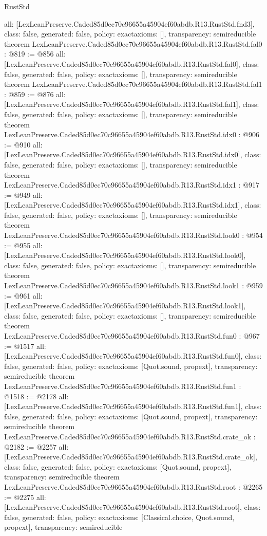 \begin{lexlean}{RustStd}
\begin{coremodule}
{  all: [LexLeanPreserve.Caded85d0ec70c96655a45904ef60abdb.R13.RustStd.fnd3],
  class: false,
  generated: false,
  policy: exact{axioms: []},
  transparency: semireducible
}
theorem LexLeanPreserve.Caded85d0ec70c96655a45904ef60abdb.R13.RustStd.fal0 : @819 := @856 {
  all: [LexLeanPreserve.Caded85d0ec70c96655a45904ef60abdb.R13.RustStd.fal0],
  class: false,
  generated: false,
  policy: exact{axioms: []},
  transparency: semireducible
}
theorem LexLeanPreserve.Caded85d0ec70c96655a45904ef60abdb.R13.RustStd.fal1 : @859 := @876 {
  all: [LexLeanPreserve.Caded85d0ec70c96655a45904ef60abdb.R13.RustStd.fal1],
  class: false,
  generated: false,
  policy: exact{axioms: []},
  transparency: semireducible
}
theorem LexLeanPreserve.Caded85d0ec70c96655a45904ef60abdb.R13.RustStd.idx0 : @906 := @910 {
  all: [LexLeanPreserve.Caded85d0ec70c96655a45904ef60abdb.R13.RustStd.idx0],
  class: false,
  generated: false,
  policy: exact{axioms: []},
  transparency: semireducible
}
theorem LexLeanPreserve.Caded85d0ec70c96655a45904ef60abdb.R13.RustStd.idx1 : @917 := @949 {
  all: [LexLeanPreserve.Caded85d0ec70c96655a45904ef60abdb.R13.RustStd.idx1],
  class: false,
  generated: false,
  policy: exact{axioms: []},
  transparency: semireducible
}
theorem LexLeanPreserve.Caded85d0ec70c96655a45904ef60abdb.R13.RustStd.look0 : @954 := @955 {
  all: [LexLeanPreserve.Caded85d0ec70c96655a45904ef60abdb.R13.RustStd.look0],
  class: false,
  generated: false,
  policy: exact{axioms: []},
  transparency: semireducible
}
theorem LexLeanPreserve.Caded85d0ec70c96655a45904ef60abdb.R13.RustStd.look1 : @959 := @961 {
  all: [LexLeanPreserve.Caded85d0ec70c96655a45904ef60abdb.R13.RustStd.look1],
  class: false,
  generated: false,
  policy: exact{axioms: []},
  transparency: semireducible
}
theorem LexLeanPreserve.Caded85d0ec70c96655a45904ef60abdb.R13.RustStd.fun0 : @967 := @1517 {
  all: [LexLeanPreserve.Caded85d0ec70c96655a45904ef60abdb.R13.RustStd.fun0],
  class: false,
  generated: false,
  policy: exact{axioms: [Quot.sound, propext]},
  transparency: semireducible
}
theorem LexLeanPreserve.Caded85d0ec70c96655a45904ef60abdb.R13.RustStd.fun1 : @1518 := @2178 {
  all: [LexLeanPreserve.Caded85d0ec70c96655a45904ef60abdb.R13.RustStd.fun1],
  class: false,
  generated: false,
  policy: exact{axioms: [Quot.sound, propext]},
  transparency: semireducible
}
theorem LexLeanPreserve.Caded85d0ec70c96655a45904ef60abdb.R13.RustStd.crate_ok : @2182 := @2257 {
  all: [LexLeanPreserve.Caded85d0ec70c96655a45904ef60abdb.R13.RustStd.crate_ok],
  class: false,
  generated: false,
  policy: exact{axioms: [Quot.sound, propext]},
  transparency: semireducible
}
theorem LexLeanPreserve.Caded85d0ec70c96655a45904ef60abdb.R13.RustStd.root : @2265 := @2275 {
  all: [LexLeanPreserve.Caded85d0ec70c96655a45904ef60abdb.R13.RustStd.root],
  class: false,
  generated: false,
  policy: exact{axioms: [Classical.choice, Quot.sound, propext]},
  transparency: semireducible
}


\end{coremodule}
\end{lexlean}
